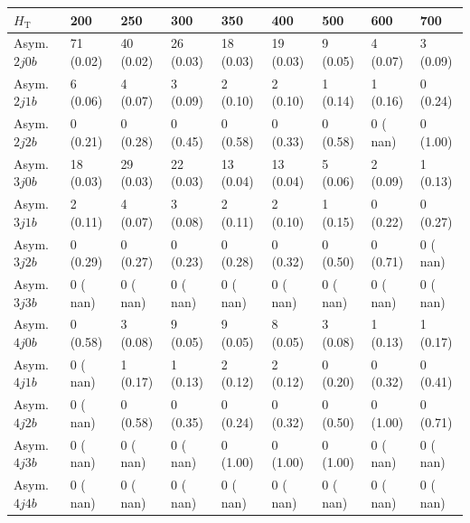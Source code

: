 \begin{table}[h]
\begin{tabular}{lllllllll}
\hline \hline
$H_\textrm{T}$                 &     200 &            250 &             300&             350&             400&             500&             600&             700  \\\hline\hline
Asym. $2j 0b$&     71 (0.02)&	   40 (0.02)&	   26 (0.03)&	   18 (0.03)&	   19 (0.03)&	    9 (0.05)&	    4 (0.07)&	    3 (0.09) \\\hline
Asym. $2j 1b$&      6 (0.06)&	    4 (0.07)&	    3 (0.09)&	    2 (0.10)&	    2 (0.10)&	    1 (0.14)&	    1 (0.16)&	    0 (0.24) \\\hline
Asym. $2j 2b$&      0 (0.21)&	    0 (0.28)&	    0 (0.45)&	    0 (0.58)&	    0 (0.33)&	    0 (0.58)&	    0 ( nan)&	    0 (1.00) \\\hline
Asym. $3j 0b$&     18 (0.03)&	   29 (0.03)&	   22 (0.03)&	   13 (0.04)&	   13 (0.04)&	    5 (0.06)&	    2 (0.09)&	    1 (0.13) \\\hline
Asym. $3j 1b$&      2 (0.11)&	    4 (0.07)&	    3 (0.08)&	    2 (0.11)&	    2 (0.10)&	    1 (0.15)&	    0 (0.22)&	    0 (0.27) \\\hline
Asym. $3j 2b$&      0 (0.29)&	    0 (0.27)&	    0 (0.23)&	    0 (0.28)&	    0 (0.32)&	    0 (0.50)&	    0 (0.71)&	    0 ( nan) \\\hline
Asym. $3j 3b$&      0 ( nan)&	    0 ( nan)&	    0 ( nan)&	    0 ( nan)&	    0 ( nan)&	    0 ( nan)&	    0 ( nan)&	    0 ( nan) \\\hline
Asym. $4j 0b$&      0 (0.58)&	    3 (0.08)&	    9 (0.05)&	    9 (0.05)&	    8 (0.05)&	    3 (0.08)&	    1 (0.13)&	    1 (0.17) \\\hline
Asym. $4j 1b$&      0 ( nan)&	    1 (0.17)&	    1 (0.13)&	    2 (0.12)&	    2 (0.12)&	    0 (0.20)&	    0 (0.32)&	    0 (0.41) \\\hline
Asym. $4j 2b$&      0 ( nan)&	    0 (0.58)&	    0 (0.35)&	    0 (0.24)&	    0 (0.32)&	    0 (0.50)&	    0 (1.00)&	    0 (0.71) \\\hline
Asym. $4j 3b$&      0 ( nan)&	    0 ( nan)&	    0 ( nan)&	    0 (1.00)&	    0 (1.00)&	    0 (1.00)&	    0 ( nan)&	    0 ( nan) \\\hline
Asym. $4j 4b$&      0 ( nan)&	    0 ( nan)&	    0 ( nan)&	    0 ( nan)&	    0 ( nan)&	    0 ( nan)&	    0 ( nan)&	    0 ( nan) \\\hline
\hline
\end{tabular}
\label{tab:sig_yields_VDM_asym}
\end{table}


